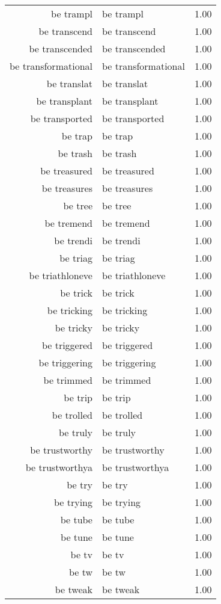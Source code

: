 \begin{table}[ht]
\begin{tabular}{rlr}
  be trampl & be trampl & 1.00 \\ 
  be transcend & be transcend & 1.00 \\ 
  be transcended & be transcended & 1.00 \\ 
  be transformational & be transformational & 1.00 \\ 
  be translat & be translat & 1.00 \\ 
  be transplant & be transplant & 1.00 \\ 
  be transported & be transported & 1.00 \\ 
  be trap & be trap & 1.00 \\ 
  be trash & be trash & 1.00 \\ 
  be treasured & be treasured & 1.00 \\ 
  be treasures & be treasures & 1.00 \\ 
  be tree & be tree & 1.00 \\ 
  be tremend & be tremend & 1.00 \\ 
  be trendi & be trendi & 1.00 \\ 
  be triag & be triag & 1.00 \\ 
  be triathloneve & be triathloneve & 1.00 \\ 
  be trick & be trick & 1.00 \\ 
  be tricking & be tricking & 1.00 \\ 
  be tricky & be tricky & 1.00 \\ 
  be triggered & be triggered & 1.00 \\ 
  be triggering & be triggering & 1.00 \\ 
  be trimmed & be trimmed & 1.00 \\ 
  be trip & be trip & 1.00 \\ 
  be trolled & be trolled & 1.00 \\ 
  be truly & be truly & 1.00 \\ 
  be trustworthy & be trustworthy & 1.00 \\ 
  be trustworthya & be trustworthya & 1.00 \\ 
  be try & be try & 1.00 \\ 
  be trying & be trying & 1.00 \\ 
  be tube & be tube & 1.00 \\ 
  be tune & be tune & 1.00 \\ 
  be tv & be tv & 1.00 \\ 
  be tw & be tw & 1.00 \\ 
  be tweak & be tweak & 1.00 \\ 

\end{tabular}
\end{table}
